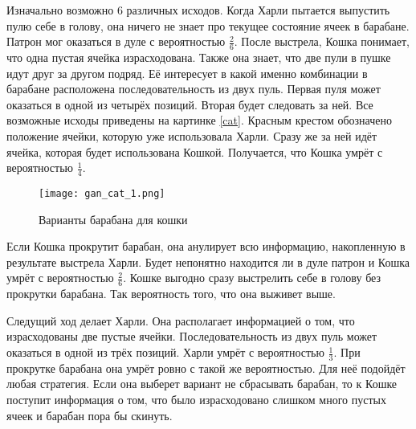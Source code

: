 \begin{sol}
Изначально возможно $6$ различных исходов. Когда Харли пытается выпустить пулю себе в голову, она ничего не знает про текущее состояние ячеек в барабане.  Патрон мог оказаться в дуле с вероятностью $\frac{2}{6}$. После выстрела, Кошка понимает, что одна пустая ячейка израсходована. Также она знает, что две пули в пушке идут друг за другом подряд. Её интересует в какой именно комбинации в барабане расположена последовательность из двух пуль. Первая пуля может оказаться в одной из четырёх позиций. Вторая будет следовать за ней. Все возможные исходы приведены на картинке \ref{cat}. Красным крестом обозначено положение ячейки, которую уже использовала Харли. Сразу же за ней идёт ячейка, которая будет использована Кошкой. Получается, что Кошка умрёт с вероятностью $\frac{1}{4}$.

\begin{figure}[H]
\begin{center}
	\texttt{[image: gan\_cat\_1.png]} \label{cat_1}
\end{center}
\caption{Варианты барабана для кошки} 
\end{figure}

Если Кошка прокрутит барабан, она анулирует всю информацию, накопленную в результате выстрела Харли. Будет непонятно находится ли в дуле патрон и Кошка умрёт с вероятностью $\frac{2}{6}$. Кошке выгодно сразу выстрелить себе в голову без прокрутки барабана. Так вероятность того, что она выживет выше.

Следущий ход делает Харли. Она располагает информацией о том, что израсходованы две пустые ячейки. Последовательность из двух пуль может оказаться в одной из трёх позиций. Харли умрёт с вероятностью $\frac{1}{3}$. При прокрутке барабана она умрёт ровно с такой же вероятностью. Для неё подойдёт любая стратегия. Если она выберет вариант не сбрасывать барабан, то к Кошке поступит информация о том, что было израсходовано слишком много пустых ячеек и барабан пора бы скинуть.
\end{sol} 


